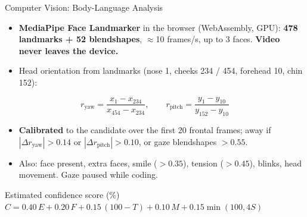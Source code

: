 \documentclass[aspectratio=169,11pt,xcolor=table]{beamer}
\begin{document}
\begin{frame}{Computer Vision: Body-Language Analysis}
  \small
  \begin{itemize}
    \item \textbf{MediaPipe Face Landmarker} in the browser (WebAssembly, GPU): \textbf{478 landmarks + 52 blendshapes}, $\approx$10 frames/s, up to 3 faces. \textbf{Video never leaves the device.}
    \item Head orientation from landmarks (nose 1, cheeks 234 / 454, forehead 10, chin 152):
  \end{itemize}
  \[
    r_{\text{yaw}} = \frac{x_{1} - x_{234}}{x_{454} - x_{234}}, \qquad r_{\text{pitch}} = \frac{y_{1} - y_{10}}{y_{152} - y_{10}}
  \]
  \begin{itemize}
    \item \textbf{Calibrated} to the candidate over the first 20 frontal frames; away if $|\Delta r_{\text{yaw}}| > 0.14$ or $|\Delta r_{\text{pitch}}| > 0.10$, or gaze blendshapes $> 0.55$.
    \item Also: face present, extra faces, smile ($>0.35$), tension ($>0.45$), blinks, head movement. Gaze paused while coding.
  \end{itemize}
  \begin{block}{Estimated confidence score (\%)}
    \centering
    $C = 0.40\,E + 0.20\,F + 0.15\,(100 - T) + 0.10\,M + 0.15\min(100, 4S)$
  \end{block}
\end{frame}
\end{document}
